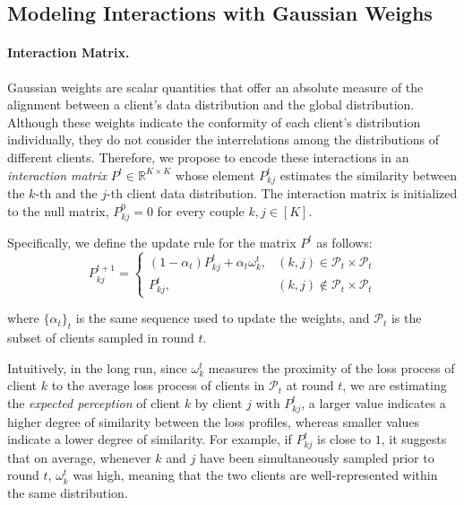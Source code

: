 \subsection{Modeling Interactions with Gaussian Weighs}\label{section:clustering}
\paragraph{Interaction Matrix.} Gaussian weights are scalar quantities that offer an absolute measure of the alignment between a client's data distribution and the global distribution. Although these weights indicate the conformity of each client's distribution individually, they do not consider the interrelations among the distributions of different clients.
Therefore, we propose to encode these interactions in an \textit{interaction matrix} $P^t \in \mathbb{R}^{K\times K}$ whose element $P_{kj}^t$ estimates the similarity between the $k$-th and the $j$-th client data distribution. The interaction matrix is initialized to the null matrix, \ie $P_{kj}^0 = 0$ for every couple $k,j \in [K]$.

Specifically, we define the update rule for the matrix $P^{t}$ as follows:
\begin{equation}\label{inter_matrix}
    P_{kj}^{t+1} = 
    \begin{cases}
        (1-\alpha_t) P_{kj}^t + \alpha_t \omega_k^t, & (k,j) \in \mathcal{P}_t \times \mathcal{P}_t\\
        P_{kj}^t, & (k,j) \notin \mathcal{P}_t \times \mathcal{P}_t
    \end{cases}
\end{equation}

where $\{\alpha_t\}_t$ is the same sequence used to update the weights, and $\mathcal{P}_t$ is the subset of clients sampled in round $t$.

Intuitively, in the long run, since $\omega_k^t$ measures the proximity of the loss process of client $k$ to the average loss process of clients in $\mathcal{P}_t$ at round $t$, we are estimating the \textit{expected perception} of client $k$ by client $j$ with $P_{kj}^t$, \ie a larger value indicates a higher degree of similarity between the loss profiles, whereas smaller values indicate a lower degree of similarity. For example, if $P_{kj}^t$ is close to $1$, it suggests that on average, whenever $k$ and $j$ have been simultaneously sampled prior to round $t$, $\omega_k^t$ was high, meaning that the two clients are well-represented within the same distribution.

